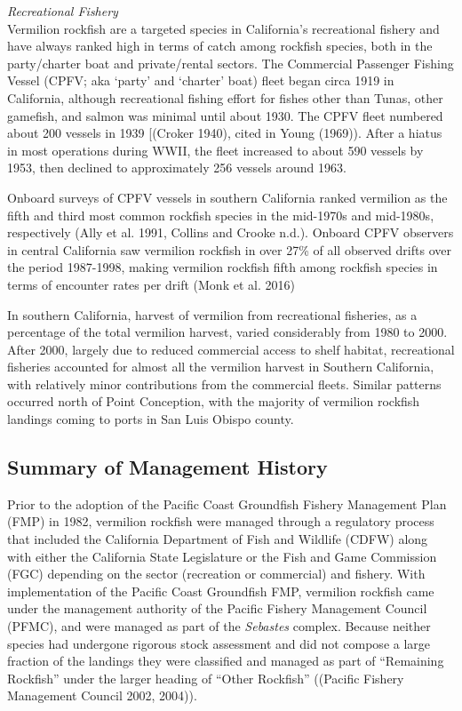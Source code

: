 \documentclass[
  english,
  a4paper,
]{article}
\begin{document}
\emph{Recreational Fishery}\\
Vermilion rockfish are a targeted species in California's recreational fishery
and have always ranked high in terms of catch among rockfish species, both in
the party/charter boat and private/rental sectors. The Commercial Passenger
Fishing Vessel (CPFV; aka `party' and `charter' boat) fleet began circa 1919
in California, although recreational fishing effort for
fishes other than Tunas, other gamefish, and salmon was minimal until about
1930. The CPFV fleet numbered about 200 vessels in 1939 {[}(Croker 1940), cited
in Young (1969)). After a hiatus in most operations during WWII, the
fleet increased to about 590 vessels by 1953, then declined to approximately
256 vessels around 1963.

Onboard surveys of CPFV vessels in southern California ranked vermilion as the
fifth and third most common rockfish species in the mid-1970s and mid-1980s,
respectively (Ally et al. 1991, Collins and Crooke n.d.). Onboard CPFV observers in central
California saw vermilion rockfish in over 27\% of all observed drifts over the
period 1987-1998, making vermilion rockfish fifth among rockfish species in terms
of encounter rates per drift (Monk et al. 2016)

In southern California, harvest of vermilion from recreational fisheries, as a
percentage of the total vermilion harvest, varied considerably from 1980 to 2000.
After 2000, largely due to reduced commercial access to shelf habitat, recreational
fisheries accounted for almost all the vermilion harvest in Southern California,
with relatively minor contributions from the commercial fleets. Similar patterns
occurred north of Point Conception, with the majority of vermilion rockfish
landings coming to ports in San Luis Obispo county.

\hypertarget{summary-of-management-history}{%
\subsection{Summary of Management History}\label{summary-of-management-history}}

Prior to the adoption of the Pacific Coast Groundfish Fishery Management Plan (FMP)
in 1982, vermilion rockfish were managed through a regulatory process that included the
California Department of Fish and Wildlife (CDFW) along
with either the California State Legislature or the Fish and Game Commission (FGC)
depending on the sector (recreation or commercial) and fishery. With implementation
of the Pacific Coast Groundfish FMP, vermilion rockfish came under the management
authority of the Pacific Fishery Management Council (PFMC), and were managed as part
of the \emph{Sebastes} complex. Because neither species had undergone rigorous stock assessment
and did not compose a large fraction of the landings they were classified and
managed as part of ``Remaining Rockfish'' under the larger
heading of ``Other Rockfish'' ((Pacific Fishery Management Council 2002, 2004)).
\end{document}
